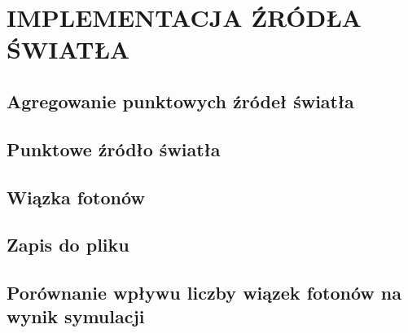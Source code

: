 \chapter{IMPLEMENTACJA ŹRÓDŁA ŚWIATŁA}
\label{chpt:implementacja-źródła-światła}
\section{Agregowanie punktowych źródeł światła}
\section{Punktowe źródło światła}
\section{Wiązka fotonów}
\section{Zapis do pliku}
\section{Porównanie wpływu liczby wiązek fotonów na wynik symulacji}
